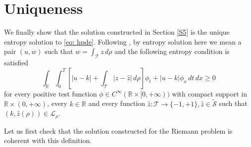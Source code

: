 \documentclass[12pt]{article}
\newcommand{\R}{\mathbb{R}}
\newcommand{\LL}{\mathcal{L}}
\newcommand{\T}{\mathcal{T}}
\newcommand{\p}{\rho}
\newcommand{\1}{\mathds{1}}
\theoremstyle{definition}
\begin{document}
\section{Uniqueness}\label{S6}
We finally show that the solution constructed in Section \ref{S5} is the unique entropy solution to \eqref{eq: hpde}. Following \cite{AVH1}, by entropy solution here we mean a pair $(u,w)$ such that $w=\int_\T z \, d\p$ and the following entropy condition is satisfied \begin{equation}\label{eq: entropycond}
        \int_{\R}\int_0^T \left[|u-k|+\int_\T |z-\hat{z}|\, d\p\right] \phi_t+|u-k|\phi_x \,dt\,dx \geq0
    \end{equation} for every positive test function $\phi \in C^{\infty}( \R \times [0,+\infty))$ with compact support in $\R\times (0,+\infty)$, every $k\in \R$ and every function $\hat{z}:\T \to \{-1,+1\}, \hat{z}\in \tilde{\mathcal S}$ such that $(k,\hat{z}(\p))\in\LL_\p.$ \par 
Let us first check that the solution constructed for the Riemann problem is coherent with this definition.
\end{document}
